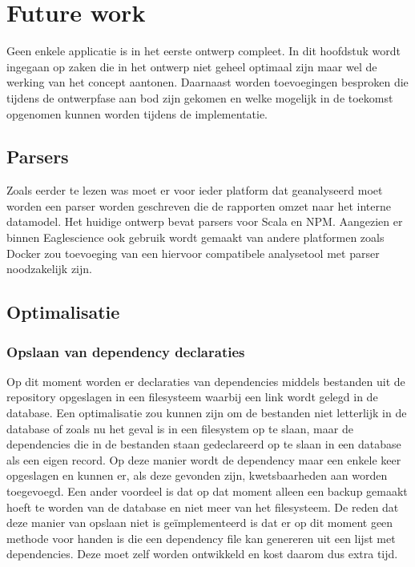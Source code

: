 
\chapter{Future work}\label{ch:name} %
Geen enkele applicatie is in het eerste ontwerp compleet. In dit hoofdstuk wordt ingegaan op zaken die in het ontwerp niet geheel optimaal zijn maar wel de werking van het concept aantonen.
Daarnaast worden toevoegingen besproken die tijdens de ontwerpfase aan bod zijn gekomen en welke mogelijk in de toekomst opgenomen kunnen worden tijdens de implementatie.


\section{Parsers}\label{sec:parsers}
Zoals eerder te lezen was moet er voor ieder platform dat geanalyseerd moet worden een parser worden geschreven die de rapporten omzet naar het interne datamodel. Het huidige ontwerp bevat parsers voor Scala en NPM. Aangezien er binnen Eaglescience ook gebruik wordt gemaakt van andere platformen zoals Docker zou toevoeging van een hiervoor compatibele analysetool met parser noodzakelijk zijn.

\section{Optimalisatie}\label{sec:optimalisatie}

\subsection{Opslaan van dependency declaraties}\label{subsec:opslaan-van-dependency-declaraties}
Op dit moment worden er declaraties van dependencies middels bestanden uit de repository opgeslagen in een filesysteem waarbij een link wordt gelegd in de database. Een optimalisatie zou kunnen zijn om de bestanden niet letterlijk in de database of zoals nu het geval is in een filesystem op te slaan, maar de dependencies die in de bestanden staan gedeclareerd op te slaan in een database als een eigen record. Op deze manier wordt de dependency maar een enkele keer opgeslagen en kunnen er, als deze gevonden zijn, kwetsbaarheden aan worden toegevoegd. Een ander voordeel is dat op dat moment alleen een backup gemaakt hoeft te worden van de database en niet meer van het filesysteem. De reden dat deze manier van opslaan niet is geïmplementeerd is dat er op dit moment geen methode voor handen is die een dependency file kan genereren uit een lijst met dependencies. Deze moet zelf worden ontwikkeld en kost daarom dus extra tijd. %


